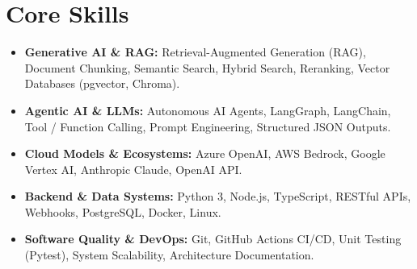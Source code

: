 \documentclass[a4paper,10pt]{article}
\begin{document}
\section{Core Skills}
\begin{itemize}
  \item \textbf{Generative AI \& RAG:} Retrieval-Augmented Generation (RAG), Document Chunking, Semantic Search, Hybrid Search, Reranking, Vector Databases (pgvector, Chroma).
  \item \textbf{Agentic AI \& LLMs:} Autonomous AI Agents, LangGraph, LangChain, Tool / Function Calling, Prompt Engineering, Structured JSON Outputs.
  \item \textbf{Cloud Models \& Ecosystems:} Azure OpenAI, AWS Bedrock, Google Vertex AI, Anthropic Claude, OpenAI API.
  \item \textbf{Backend \& Data Systems:} Python 3, Node.js, TypeScript, RESTful APIs, Webhooks, PostgreSQL, Docker, Linux.
  \item \textbf{Software Quality \& DevOps:} Git, GitHub Actions CI/CD, Unit Testing (Pytest), System Scalability, Architecture Documentation.
\end{itemize}
\end{document}

